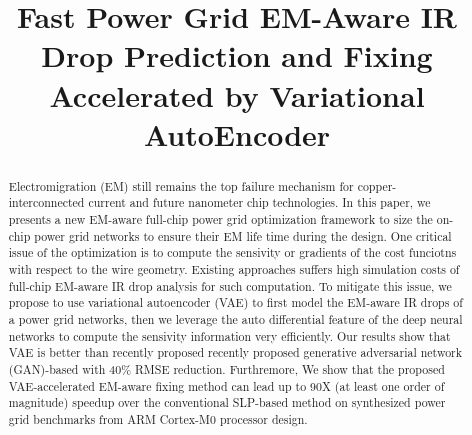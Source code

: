 \documentclass[journal]{IEEEtran}
\begin{document}
\title{Fast Power Grid EM-Aware IR Drop Prediction and Fixing
  Accelerated by Variational AutoEncoder}



\maketitle
  
\begin{abstract}
  Electromigration (EM) still remains the top failure mechanism for
  copper-interconnected current and future nanometer chip
  technologies.  In this paper, we presents a new EM-aware full-chip
  power grid optimization framework to size the on-chip power grid
  networks to ensure their EM life time during the design. One
  critical issue of the optimization is to compute the sensivity or
  gradients of the cost funciotns with respect to the wire
  geometry. Existing approaches suffers high simulation costs of
  full-chip EM-aware IR drop analysis for such computation. To
  mitigate this issue, we propose to use variational autoencoder (VAE)
  to first model the EM-aware IR drops of a power grid networks, then
  we leverage the auto differential feature of the deep neural
  networks to compute the sensivity information very efficiently. Our
  results show that VAE is better than recently proposed recently
  proposed generative adversarial network (GAN)-based with 40$\%$ RMSE
  reduction. Furthremore, 
  We show that the proposed VAE-accelerated EM-aware fixing method can
  lead up to 90X (at least one order of magnitude) speedup over the
  conventional SLP-based method on synthesized power grid benchmarks
  from ARM Cortex-M0 processor design.

\end{abstract}
 
\end{document}
